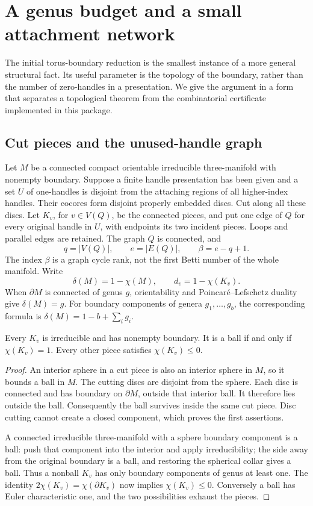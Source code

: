 \section{A genus budget and a small attachment network}
\label{sec:attachment-kernel}

The initial torus-boundary reduction is the smallest instance of a more
general structural fact.  Its useful parameter is the topology of the
boundary, rather than the number of zero-handles in a presentation.  We
give the argument in a form that separates a topological theorem from the
combinatorial certificate implemented in this package.

\subsection{Cut pieces and the unused-handle graph}

Let $M$ be a connected compact orientable irreducible three-manifold with
nonempty boundary.  Suppose a finite handle presentation has been given
and a set $U$ of one-handles is disjoint from the attaching regions of all
higher-index handles.  Their cocores form disjoint properly embedded
discs.  Cut along all these discs.  Let $K_v$, for $v\in V(Q)$, be the
connected pieces, and put one edge of $Q$ for every original handle in
$U$, with endpoints its two incident pieces.  Loops and parallel edges
are retained.  The graph $Q$ is connected, and
\[
 q=|V(Q)|,\qquad e=|E(Q)|,\qquad \beta=e-q+1.
\]
The index $\beta$ is a graph cycle rank, not the first Betti number of the
whole manifold.  Write
\[
 \delta(M)=1-\chi(M),\qquad d_v=1-\chi(K_v).
\]
When $\partial M$ is connected of genus $g$, orientability and
Poincar\'e--Lefschetz duality give $\delta(M)=g$.  For boundary components
of genera $g_1,\ldots,g_b$, the corresponding formula is
$\delta(M)=1-b+\sum_i g_i$.

\begin{lemma}
\label{lem:disc-euler}
Every $K_v$ is irreducible and has nonempty boundary.  It is a ball if and
only if $\chi(K_v)=1$.  Every other piece satisfies $\chi(K_v)\leq0$.
\end{lemma}
\begin{proof}
An interior sphere in a cut piece is also an interior sphere in $M$, so
it bounds a ball in $M$.  The cutting discs are disjoint from the sphere.
Each disc is connected and has boundary on $\partial M$, outside that
interior ball.  It therefore lies outside the ball.  Consequently the
ball survives inside the same cut piece.  Disc cutting cannot create a
closed component, which proves the first assertions.

A connected irreducible three-manifold with a sphere boundary component
is a ball: push that component into the interior and apply irreducibility;
the side away from the original boundary is a ball, and restoring the
spherical collar gives a ball.  Thus a nonball $K_v$ has only boundary
components of genus at least one.  The identity
$2\chi(K_v)=\chi(\partial K_v)$ now implies $\chi(K_v)\leq0$.
Conversely a ball has Euler characteristic one, and the two possibilities
exhaust the pieces.
\end{proof}


